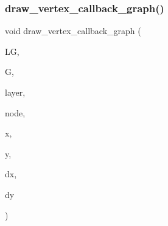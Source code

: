 \mbox{\label{layered__graph__main_8_c_a48fa52122e4195a9e84162168e41b79d}} 
\subsubsection{\texorpdfstring{draw\+\_\+vertex\+\_\+callback\+\_\+graph()}{draw\_vertex\_callback\_graph()}}
{\footnotesize\ttfamily void draw\+\_\+vertex\+\_\+callback\+\_\+graph (\begin{DoxyParamCaption}\item[{\mbox{\hyperlink{classlayered__graph}{layered\+\_\+graph}} $\ast$}]{LG,  }\item[{\mbox{\hyperlink{classmp__graphics}{mp\+\_\+graphics}} $\ast$}]{G,  }\item[{\mbox{\hyperlink{galois_8h_a09fddde158a3a20bd2dcadb609de11dc}{I\+NT}}}]{layer,  }\item[{\mbox{\hyperlink{galois_8h_a09fddde158a3a20bd2dcadb609de11dc}{I\+NT}}}]{node,  }\item[{\mbox{\hyperlink{galois_8h_a09fddde158a3a20bd2dcadb609de11dc}{I\+NT}}}]{x,  }\item[{\mbox{\hyperlink{galois_8h_a09fddde158a3a20bd2dcadb609de11dc}{I\+NT}}}]{y,  }\item[{\mbox{\hyperlink{galois_8h_a09fddde158a3a20bd2dcadb609de11dc}{I\+NT}}}]{dx,  }\item[{\mbox{\hyperlink{galois_8h_a09fddde158a3a20bd2dcadb609de11dc}{I\+NT}}}]{dy }\end{DoxyParamCaption})}

\mbox{\label{layered__graph__main_8_c_a3a039b2353485afbc1ef07bcb0a2845c}} 
